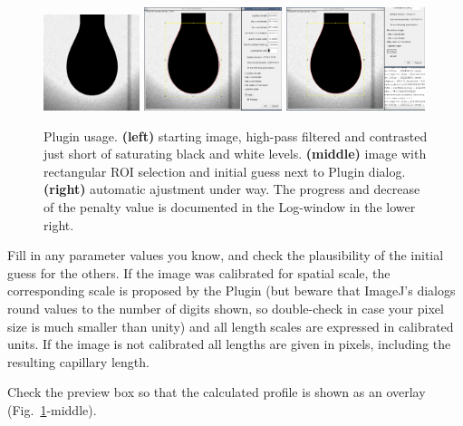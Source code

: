\documentclass[fleqn]{scrartcl}
\begin{document}
\begin{figure}
  \centering
  \includegraphics[width=0.25\textwidth]{eauContrasteMax}\hfill
  \includegraphics[width=0.36\textwidth]{eauContrasteMaxInitial.png}\hfill
  \includegraphics[width=0.36\textwidth]{eauContrasteMaxFit2.png}
  \caption{Plugin usage. \textbf{(left)} starting image, high-pass
    filtered and contrasted just short of saturating black and white
    levels. \textbf{(middle)} image with rectangular ROI selection and
    initial guess next to Plugin dialog. \textbf{(right)} automatic
    ajustment under way. The progress and decrease of the penalty
    value is documented in the Log-window in the lower right.}
  \label{fig:usage}
\end{figure}

Fill in any parameter values you know, and check the plausibility of
the initial guess for the others. If the image was calibrated for
spatial scale, the corresponding scale is proposed by the Plugin (but
beware that ImageJ's dialogs round values to the number of digits
shown, so double-check in case your pixel size is much smaller than
unity) and all length scales are expressed in calibrated units. If the
image is not calibrated all lengths are given in pixels, including the
resulting capillary length.

Check the preview box so that the calculated profile is shown as an
overlay (Fig.~\ref{fig:usage}-middle).
\end{document}
